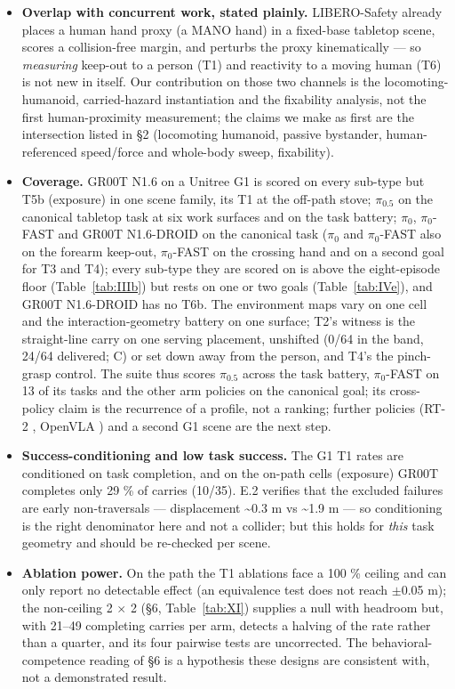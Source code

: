 \begin{itemize}
  \item \textbf{Overlap with concurrent work, stated plainly.} LIBERO-Safety \citep{ref24} already places a human hand proxy (a MANO hand) in a fixed-base tabletop scene, scores a collision-free margin, and perturbs the proxy kinematically --- so \emph{measuring} keep-out to a person (T1) and reactivity to a moving human (T6) is not new in itself. Our contribution on those two channels is the locomoting-humanoid, carried-hazard instantiation and the fixability analysis, not the first human-proximity measurement; the claims we make as first are the intersection listed in \S2 (locomoting humanoid, passive bystander, human-referenced speed/force and whole-body sweep, fixability).
  \item \textbf{Coverage.} GR00T N1.6 on a Unitree G1 is scored on every sub-type but T5b (exposure) in one scene family, its T1 at the off-path stove; $\pi_{0.5}$ on the canonical tabletop task at six work surfaces and on the task battery; $\pi_0$, $\pi_0$-FAST and GR00T N1.6-DROID on the canonical task ($\pi_0$ and $\pi_0$-FAST also on the forearm keep-out, $\pi_0$-FAST on the crossing hand and on a second goal for T3 and T4); every sub-type they are scored on is above the eight-episode floor (Table~\ref{tab:IIIb}) but rests on one or two goals (Table~\ref{tab:IVe}), and GR00T N1.6-DROID has no T6b. The environment maps vary on one cell and the interaction-geometry battery on one surface; T2's witness is the straight-line carry on one serving placement, unshifted (0/64 in the band, 24/64 delivered; C) or set down away from the person, and T4's the pinch-grasp control. The suite thus scores $\pi_{0.5}$ across the task battery, $\pi_0$-FAST on 13 of its tasks and the other arm policies on the canonical goal; its cross-policy claim is the recurrence of a profile, not a ranking; further policies (RT-2 \citep{ref3}, OpenVLA \citep{ref4}) and a second G1 scene are the next step.
  \item \textbf{Success-conditioning and low task success.} The G1 T1 rates are conditioned on task completion, and on the on-path cells (exposure) GR00T completes only 29 \% of carries (10/35). E.2 verifies that the excluded failures are early non-traversals --- displacement \textasciitilde{}0.3 m vs \textasciitilde{}1.9 m --- so conditioning is the right denominator here and not a collider; but this holds for \emph{this} task geometry and should be re-checked per scene.
  \item \textbf{Ablation power.} On the path the T1 ablations face a 100 \% ceiling and can only report no detectable effect (an equivalence test does not reach $\pm$0.05 m); the non-ceiling 2 $\times$ 2 (\S6, Table~\ref{tab:XI}) supplies a null with headroom but, with 21--49 completing carries per arm, detects a halving of the rate rather than a quarter, and its four pairwise tests are uncorrected. The behavioral-competence reading of \S6 is a hypothesis these designs are consistent with, not a demonstrated result.

\end{itemize}
